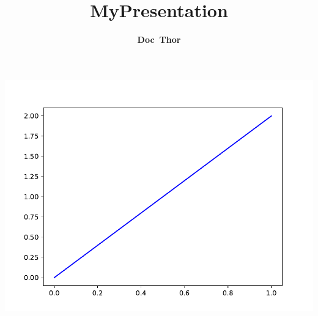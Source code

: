 \documentclass[compress]{beamer}
\begin{document}
\begin{frame}
\vspace{-.5\baselineskip}
\title{\normalsize{MyPresentation}}
\author{\textbf{Doc~Thor}}

\maketitle
\centering
\includegraphics[width = .5\textwidth, height = .5\textheight, keepaspectratio]{img/fig2.pdf} 
\end{frame}
\end{document}
